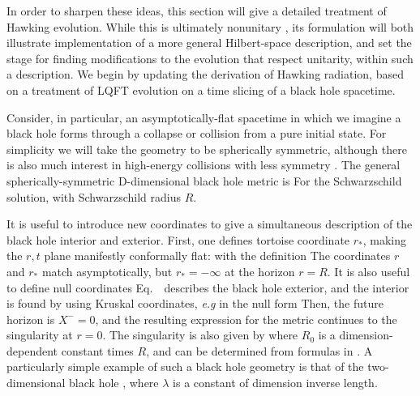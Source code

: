 
In order to sharpen these ideas,  this section will give a detailed treatment of Hawking evolution.  While this  is ultimately nonunitary \Hawkunc, its formulation will both illustrate implementation of a more general Hilbert-space description, and set the stage for finding modifications to the evolution that respect unitarity, within such a description.  We begin by updating the derivation of Hawking radiation, based on a treatment of LQFT evolution on a time slicing of a black hole spacetime.


Consider, in particular, an asymptotically-flat spacetime in which we imagine a black hole forms through a collapse or collision from a pure initial state.  For simplicity we will take the geometry to be spherically symmetric, although there is also much interest in high-energy collisions with less symmetry .  The general spherically-symmetric D-dimensional black hole metric is
%
\eqn{}
%
For the Schwarzschild solution,
%
\eqn{}
%
with Schwarzschild radius $R$. 

It is useful to introduce new coordinates to give a simultaneous description of the black hole interior and exterior.  First, one defines tortoise coordinate $r_*$, making the $r,t$ plane manifestly conformally flat:
%
\eqn{}
%
with the definition
%
\eqn{}
%
The coordinates $r$ and $r_*$ match asymptotically, but $r_*=-\infty$ at the horizon $r=R$.  It is also useful to define null coordinates
%
\eqn{}
%
Eq.~\tortmet\ describes the black hole exterior, and the interior is found by using Kruskal coordinates, {\it e.g} in the null form
%
\eqn{}
%
Then, the future horizon is $X^-=0$, and the resulting expression for the metric continues to the singularity at $r=0$.  The singularity is also given by 
%
\eqn{}
%
 where $R_0$ is a dimension-dependent constant times $R$, and can be determined from formulas in .
A particularly simple example of such a black hole geometry is that of the two-dimensional black hole ,
%
\eqn{}
%
where $\lambda$ is a constant of dimension inverse length.

